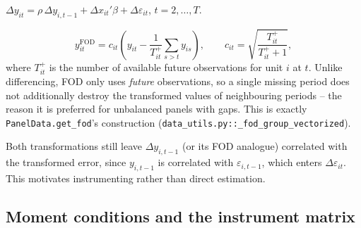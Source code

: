 \documentclass[11pt,a4paper]{article}
\begin{document}
\begin{description}[nosep]
  \item[First differences] $\Delta y_{it} = \rho\,\Delta y_{i,t-1} +
    \Delta x_{it}'\beta + \Delta\varepsilon_{it}$, $t=2,\dots,T$.
  \item[Forward orthogonal deviations (FOD)] \citep{ArellanoBover1995}
    \[
      y_{it}^{\mathrm{FOD}} = c_{it}\left(y_{it} - \frac{1}{T_{it}^{+}}\sum_{s>t} y_{is}\right),
      \qquad c_{it} = \sqrt{\frac{T_{it}^{+}}{T_{it}^{+}+1}},
    \]
    where $T_{it}^{+}$ is the number of available future observations for
    unit $i$ at $t$. Unlike differencing, FOD only uses \emph{future}
    observations, so a single missing period does not additionally destroy
    the transformed values of neighbouring periods -- the reason it is
    preferred for unbalanced panels with gaps. This is exactly
    \texttt{PanelData.get\_fod}'s construction
    (\texttt{data\_utils.py::\_fod\_group\_vectorized}).
\end{description}

Both transformations still leave $\Delta y_{i,t-1}$ (or its FOD analogue)
correlated with the transformed error, since $y_{i,t-1}$ is correlated with
$\varepsilon_{i,t-1}$, which enters $\Delta\varepsilon_{it}$. This motivates
instrumenting rather than direct estimation.

\subsection{Moment conditions and the instrument matrix}
\label{sec:moments}
\end{document}
